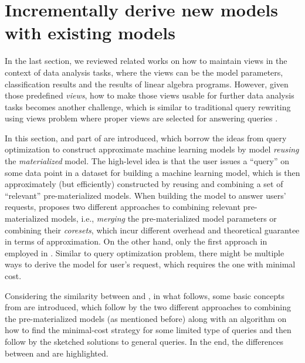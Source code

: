 \section{Incrementally derive new models with existing models}\label{sec: view_reuse}
In the last section, we reviewed related works on how to maintain views in the context of data analysis tasks, where the views can be the model parameters, classification results and the results of linear algebra programs. However, given those predefined {\em views}, how to make those views usable for further data analysis tasks becomes another challenge, which is similar to traditional query rewriting using views problem where proper views are selected for answering queries \cite{halevy2001answering}.

In this section, \cite{hasani2018efficient} and part of \cite{gupta2015processing} are introduced, which borrow the ideas from query optimization to construct approximate machine learning models by model {\em reusing} the {\em materialized} model. The high-level idea is that the user issues a ``query'' on some data point in a dataset for building a machine learning model, which is then approximately (but efficiently) constructed by reusing and combining a set of ``relevant'' pre-materialized models. When building the model to answer users' requests, \cite{hasani2018efficient} proposes two different approaches to combining relevant pre-materialized models, i.e., {\em merging} the pre-materialized model parameters or combining their {\em coresets}, which incur different overhead and theoretical guarantee in terms of approximation.  On the other hand, only the first approach in employed in \cite{gupta2015processing}. Similar to query optimization problem, there might be multiple ways to derive the model for user's request, which requires the one with minimal cost.

Considering the similarity between \cite{hasani2018efficient} and \cite{gupta2015processing}, in what follows, some basic concepts from \cite{hasani2018efficient} are introduced, which follow by the two different approaches to combining the pre-materialized models (as mentioned before) along with an algorithm on how to find the minimal-cost strategy for some limited type of queries and then follow by the sketched solutions to general queries. In the end, the differences between \cite{hasani2018efficient} and \cite{gupta2015processing} are highlighted.


